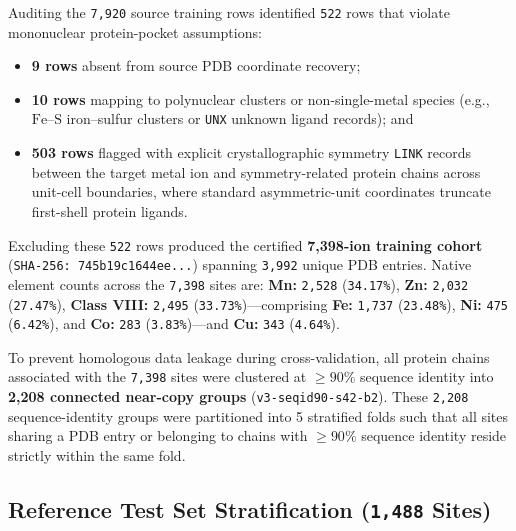 \documentclass[10pt,a4paper,twocolumn]{article}
\begin{document}
Auditing the \texttt{7,920} source training rows identified \texttt{522} rows that violate mononuclear protein-pocket assumptions:
\begin{itemize}
  \item \textbf{9 rows} absent from source PDB coordinate recovery;
  \item \textbf{10 rows} mapping to polynuclear clusters or non-single-metal species (e.g., $\text{Fe--S}$ iron--sulfur clusters or \texttt{UNX} unknown ligand records); and
  \item \textbf{503 rows} flagged with explicit crystallographic symmetry \texttt{LINK} records between the target metal ion and symmetry-related protein chains across unit-cell boundaries, where standard asymmetric-unit coordinates truncate first-shell protein ligands.
\end{itemize}
Excluding these \texttt{522} rows produced the certified \textbf{7,398-ion training cohort} (\texttt{SHA-256: 745b19c1644ee...}) spanning \texttt{3,992} unique PDB entries. Native element counts across the \texttt{7,398} sites are: \textbf{Mn:} \texttt{2,528} (\texttt{34.17\%}), \textbf{Zn:} \texttt{2,032} (\texttt{27.47\%}), \textbf{Class VIII:} \texttt{2,495} (\texttt{33.73\%})---comprising \textbf{Fe:} \texttt{1,737} (\texttt{23.48\%}), \textbf{Ni:} \texttt{475} (\texttt{6.42\%}), and \textbf{Co:} \texttt{283} (\texttt{3.83\%})---and \textbf{Cu:} \texttt{343} (\texttt{4.64\%}).

To prevent homologous data leakage during cross-validation, all protein chains associated with the \texttt{7,398} sites were clustered at $\ge 90\%$ sequence identity into \textbf{2,208 connected near-copy groups} (\texttt{v3-seqid90-s42-b2}). These \texttt{2,208} sequence-identity groups were partitioned into 5 stratified folds such that all sites sharing a PDB entry or belonging to chains with $\ge 90\%$ sequence identity reside strictly within the same fold.

\subsection{Reference Test Set Stratification (\texttt{1,488} Sites)}
\end{document}
